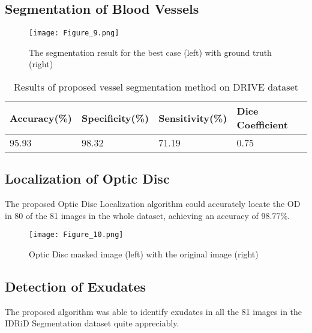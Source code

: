\documentclass{svproc}
\begin{document}
\subsection{Segmentation of Blood Vessels}


\vspace{-2mm}
\begin{figure}[H]
    \centering
    \texttt{[image: Figure\_9.png]}
    \caption{The segmentation result for the best case (left) with ground truth (right)}
    \label{fig: fig9}
\end{figure}


\vspace{-12mm}
\begin{table}[H]
    \centering
    \caption{Results of proposed vessel segmentation method on DRIVE dataset}
    \label{tab: table1}
    \vspace{2mm}
    \begin{tabular}{| p{} | p{} | p{} | p{} | }
    \hline
        \textbf{Accuracy(\%)} & \textbf{Specificity(\%)} & \textbf{Sensitivity(\%)} & \textbf{Dice Coefficient}  \\
        \hline
        95.93 & 98.32 & 71.19 & 0.75 \\
    \hline
    \end{tabular}
\end{table}

\subsection{Localization of Optic Disc}

The proposed Optic Disc Localization algorithm could accurately locate the OD in 80 of the 81 images in the whole dataset, achieving an accuracy of 98.77\%.

\begin{figure}
    \centering
    \texttt{[image: Figure\_10.png]}
    \caption{Optic Disc masked image (left) with the original image (right)}
    \label{fig: fig10}
\end{figure}

\subsection{Detection of Exudates}

The proposed algorithm was able to identify exudates in all the 81 images in the IDRiD Segmentation dataset quite appreciably.
\end{document}

